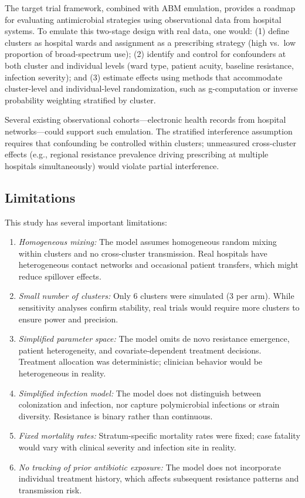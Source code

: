 \documentclass[preprint,11pt]{elsarticle}
\begin{document}
The target trial framework, combined with ABM emulation, provides a roadmap for evaluating antimicrobial strategies using observational data from hospital systems. To emulate this two-stage design with real data, one would: (1) define clusters as hospital wards and assignment as a prescribing strategy (high vs.\ low proportion of broad-spectrum use); (2) identify and control for confounders at both cluster and individual levels (ward type, patient acuity, baseline resistance, infection severity); and (3) estimate effects using methods that accommodate cluster-level and individual-level randomization, such as g-computation or inverse probability weighting stratified by cluster.

Several existing observational cohorts---electronic health records from hospital networks---could support such emulation. The stratified interference assumption requires that confounding be controlled within clusters; unmeasured cross-cluster effects (e.g., regional resistance prevalence driving prescribing at multiple hospitals simultaneously) would violate partial interference.

\subsection{Limitations}

This study has several important limitations:

\begin{enumerate}
  \item \textit{Homogeneous mixing:} The model assumes homogeneous random mixing within clusters and no cross-cluster transmission. Real hospitals have heterogeneous contact networks and occasional patient transfers, which might reduce spillover effects.

  \item \textit{Small number of clusters:} Only 6 clusters were simulated (3 per arm). While sensitivity analyses confirm stability, real trials would require more clusters to ensure power and precision.

  \item \textit{Simplified parameter space:} The model omits de novo resistance emergence, patient heterogeneity, and covariate-dependent treatment decisions. Treatment allocation was deterministic; clinician behavior would be heterogeneous in reality.

  \item \textit{Simplified infection model:} The model does not distinguish between colonization and infection, nor capture polymicrobial infections or strain diversity. Resistance is binary rather than continuous.

  \item \textit{Fixed mortality rates:} Stratum-specific mortality rates were fixed; case fatality would vary with clinical severity and infection site in reality.

  \item \textit{No tracking of prior antibiotic exposure:} The model does not incorporate individual treatment history, which affects subsequent resistance patterns and transmission risk.
\end{enumerate}
\end{document}
